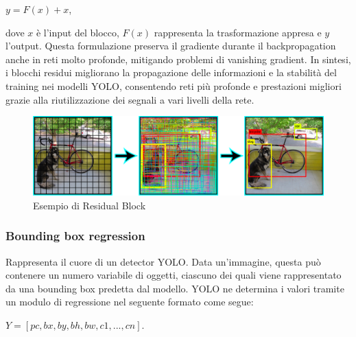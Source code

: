 \documentclass[12pt]{article}
\begin{document}
\begin{center}
$y = F(x)+x$,    
\end{center}
dove $x$ è l’input del blocco, $F(x)$ rappresenta la trasformazione appresa e $y$ l’output. Questa formulazione preserva il gradiente durante il backpropagation anche in reti molto profonde, mitigando problemi di vanishing gradient. In sintesi, i blocchi residui migliorano la propagazione delle informazioni e la stabilità del training nei modelli YOLO, consentendo reti più profonde e prestazioni migliori grazie alla riutilizzazione dei segnali a vari livelli della rete.

\begin{figure}[H]
    \centering
    \includegraphics[width=1.1\textwidth]{./img/residual-block-img.png}
    \caption{Esempio di Residual Block}
    \label{fig:residual-block-example}
\end{figure}


\subsubsection{Bounding box regression} 

Rappresenta il cuore di un detector YOLO. Data un’immagine, questa può contenere un numero variabile di oggetti, ciascuno dei quali viene rappresentato da una bounding box predetta dal modello. YOLO ne determina i valori tramite un modulo di regressione nel seguente formato come segue: 

\begin{center}
$Y = [pc, bx, by, bh, bw, c1, ... , cn]$.    
\end{center}
\end{document}
